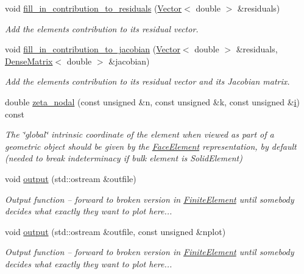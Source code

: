 \begin{DoxyCompactItemize}
void \hyperlink{classoomph_1_1AdvectionDiffusionFluxElement_a7448e4359840f5090f879bc82b2319f8}{fill\+\_\+in\+\_\+contribution\+\_\+to\+\_\+residuals} (\hyperlink{classoomph_1_1Vector}{Vector}$<$ double $>$ \&residuals)
\begin{DoxyCompactList}\small\item\em Add the element\textquotesingle{}s contribution to its residual vector. \end{DoxyCompactList}\item 
void \hyperlink{classoomph_1_1AdvectionDiffusionFluxElement_a5c8e409a31f90858e556fe359b996b9d}{fill\+\_\+in\+\_\+contribution\+\_\+to\+\_\+jacobian} (\hyperlink{classoomph_1_1Vector}{Vector}$<$ double $>$ \&residuals, \hyperlink{classoomph_1_1DenseMatrix}{Dense\+Matrix}$<$ double $>$ \&jacobian)
\begin{DoxyCompactList}\small\item\em Add the element\textquotesingle{}s contribution to its residual vector and its Jacobian matrix. \end{DoxyCompactList}\item 
double \hyperlink{classoomph_1_1AdvectionDiffusionFluxElement_aaf962dc2e0fccdafa7210bbaaf2fbbd6}{zeta\+\_\+nodal} (const unsigned \&n, const unsigned \&k, const unsigned \&\hyperlink{cfortran_8h_adb50e893b86b3e55e751a42eab3cba82}{i}) const
\begin{DoxyCompactList}\small\item\em The \char`\"{}global\char`\"{} intrinsic coordinate of the element when viewed as part of a geometric object should be given by the \hyperlink{classoomph_1_1FaceElement}{Face\+Element} representation, by default (needed to break indeterminacy if bulk element is Solid\+Element) \end{DoxyCompactList}\item 
void \hyperlink{classoomph_1_1AdvectionDiffusionFluxElement_a23efe876b380f81188dcb506ac24266b}{output} (std\+::ostream \&outfile)
\begin{DoxyCompactList}\small\item\em Output function -- forward to broken version in \hyperlink{classoomph_1_1FiniteElement}{Finite\+Element} until somebody decides what exactly they want to plot here... \end{DoxyCompactList}\item 
void \hyperlink{classoomph_1_1AdvectionDiffusionFluxElement_a6a080d1e107612072d9069f909a2b5b0}{output} (std\+::ostream \&outfile, const unsigned \&nplot)
\begin{DoxyCompactList}\small\item\em Output function -- forward to broken version in \hyperlink{classoomph_1_1FiniteElement}{Finite\+Element} until somebody decides what exactly they want to plot here... \end{DoxyCompactList}\end{DoxyCompactItemize}

